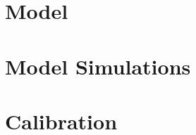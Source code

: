 \documentclass[compress, 8pt]{beamer}
\begin{document}
\section[Model]{Model}



\miniframesoff
\section[Simulations]{Model Simulations}
\begin{frame}
    \tableofcontents[currentsection]
\end{frame}
\miniframeson



\miniframesoff
\section[Calibration]{Calibration}
\begin{frame}
    \tableofcontents[currentsection]
\end{frame}
\miniframeson
\end{document}
